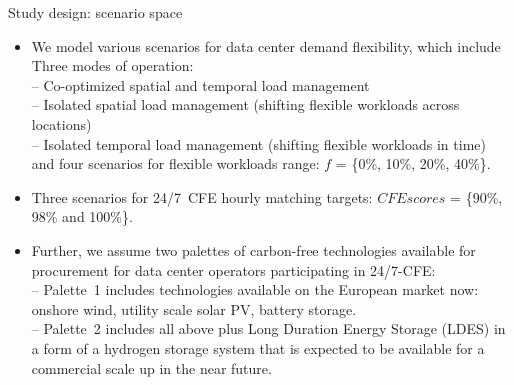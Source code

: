 \begin{frame}{Study design: scenario space}

  {\footnotesize 
  \begin{itemize}

  \item We model various scenarios for data center demand flexibility, which include \\
  \vspace{0.1cm}
  Three modes of operation: \\
    -- \alert{Co-optimized spatial and temporal} load management \\
    -- \alert{Isolated spatial} load management (shifting flexible workloads across locations)\\ 
    -- \alert{Isolated temporal} load management (shifting flexible workloads in time) \\ 
  \vspace{0.1cm}
  and four scenarios for flexible workloads range: \alert{$f$ = \{0\%, 10\%, 20\%, 40\%\}}.

  \item Three scenarios for 24/7~CFE hourly matching targets:
  \alert{$CFE scores$ = \{90\%, 98\% and 100\%\}}.
  
  \item Further, we assume two palettes of carbon-free technologies available for procurement for data center operators participating in 24/7-CFE: \\
  \vspace{0.1cm}
  -- \alert{Palette~1} includes technologies available on the European market now: onshore wind, utility scale solar PV, battery storage. \\
  -- \alert{Palette~2} includes all above plus Long Duration Energy Storage (LDES) in a form of a hydrogen storage system that is expected to be available for a commercial scale up in the near future. 
  

  \end{itemize}
  }
\end{frame}




